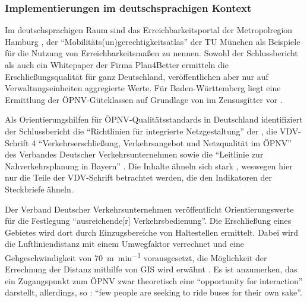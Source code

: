 \documentclass[11pt,pdftex,a4paper]{scrartcl}
\begin{document}
	\subsubsection{Implementierungen im deutschsprachigen Kontext}
	Im deutschsprachigen Raum sind das Erreichbarkeitsportal der Metropolregion Hamburg \parencite{GeoportalMetropolregionHamburg}, der \enquote{Mobilitäts(un)gerechtigkeitsatlas} der TU München \parencites{buttnerTUMAccessibilityAtlas2018}{TUMMobilitatsungerechtigkeitsatlas} als Beispiele für die Nutzung von Erreichbarkeitsmaßen zu nennen. Sowohl der Schlussbericht als auch ein Whitepaper der Firma Plan4Better \parencite{plan4betterDeutschlandweiteBewertungOV} ermitteln die Erschließungsqualität für ganz Deutschland, veröffentlichen aber nur auf Verwaltungseinheiten aggregierte Werte. Für Baden-Württemberg liegt eine Ermittlung der ÖPNV-Güteklassen auf Grundlage von \textcite{orokOsterreichweitenOVGuteklassenRahmen2022} im Zensusgitter vor \parencite{verkehrsministeriumbaden-wurttembergOPNVGuteklassenZensusrasterDarstellungFur2025}.
	
	Als Orientierungshilfen für ÖPNV-Qualitätsstandards in Deutschland identifiziert der Schlussbericht die \enquote{Richtlinien für integrierte Netzgestaltung} der \textcite{FGSVRichtlinienFuerIntegrierte2008}, die VDV-Schrift 4 \enquote{Verkehrserschließung, Verkehrsangebot und Netzqualität im ÖPNV} des Verbandes Deutscher Verkehrsunternehmen \parencite{VDVSchrift4Verkehrserschliessung2019} sowie die \enquote{Leitlinie zur Nahverkehrsplanung in Bayern} \parencite{baystmvwtLeitlinieZurNahverkehrsplanung1998}. Die Inhalte ähneln sich stark \parencite[vgl.][47]{kcwgmbhMethodikUndEmpfehlungen2024}, weswegen hier nur die Teile der VDV-Schrift betrachtet werden, die den Indikatoren der Steckbriefe ähneln.

	Der Verband Deutscher Verkehrsunternehmen veröffentlicht Orientierungswerte für die Festlegung \enquote{ausreichende[r] Verkehrsbedienung}\parencites[5 bzw. vgl.]{VDVSchrift4Verkehrserschliessung2019}[§8 Abs. 3, §9 Abs. 1]{PBefGPersonenbeforderungsgesetz}. Die Erschließung eines Gebietes wird dort durch Einzugsbereiche von Haltestellen ermittelt. Dabei wird die Luftliniendistanz mit einem Umwegfaktor verrechnet und eine Gehgeschwindigkeit von \SI{70}{\metre\per\minute} vorausgesetzt, die Möglichkeit der Errechnung der Distanz mithilfe von GIS wird erwähnt \parencite[vgl.][15f]{VDVSchrift4Verkehrserschliessung2019}. Es ist anzumerken, das ein Zugangspunkt zum ÖPNV zwar theoretisch eine \enquote{opportunity for interaction} \parencite[73]{hansenHowAccessibilityShapes1959} darstellt, allerdings, so \textcite[17]{levinsonTransportAccessManual2020}: \enquote{few people are seeking to ride buses for their own sake}. 
	
\end{document}
